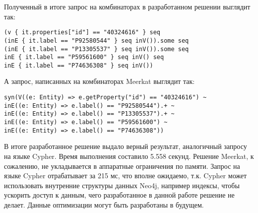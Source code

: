 Полученный в итоге запрос на комбинаторах в разработанном решении выглядит так:
\begin{lstlisting}
(v { it.properties["id"] == "40324616" } seq
(inE { it.label == "P92580544" } seq inV()).some seq
(inE { it.label == "P13305537" } seq inV()).some seq
inE { it.label == "P59561600" } seq inV() seq
inE { it.label == "P74636308" } seq inV())
\end{lstlisting}

А запрос, написанных на комбинаторах Meerkat выглядит так:
\begin{lstlisting}
syn(V((e: Entity) => e.getProperty("id") == "40324616") ~
inE((e: Entity) => e.label() == "P92580544").+ ~
inE((e: Entity) => e.label() == "P13305537").+ ~
inE((e: Entity) => e.label() == "P59561600") ~
inE((e: Entity) => e.label() == "P74636308"))
\end{lstlisting}

В итоге разработанное решение выдало верный результат, аналогичный запросу на языке Cypher. Время выполнения составило 5.558 секунд. Решение Meerkat, к сожалению, не укладывается в аппаратные ограничения по памяти. Запрос на языке Cypher отрабатывает за 215 мс, что вполне ожидаемо, т.к. Cypher может использовать внутренние структуры данных Neo4j, например индексы, чтобы ускорить доступ к данным, чего разработанное в данной работе решение не делает. Данные оптимизации могут быть разработаны в будущем.
